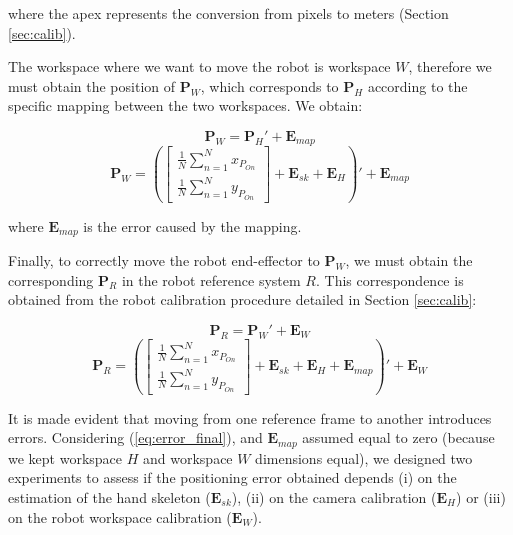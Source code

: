 \documentclass[a4paper, 10 pt, conference]{ieeeconf}      %
\begin{document}
where the apex represents the conversion from pixels to meters (Section \ref{sec:calib}).

The workspace where we want to move the robot is workspace $W$, therefore we must obtain the position of $\mathbf{P}_W$, which corresponds to $\mathbf{P}_H$ according to the specific mapping between the two workspaces. We obtain:

\begin{equation}
\mathbf{P}_W = \mathbf{P}_H' + \mathbf{E}_{map}
\end{equation}
\begin{equation}
\mathbf{P}_W = \left(\begin{bmatrix}
\frac{1}{N}\sum_{n=1}^{N}x_{P_{On}} \\
\frac{1}{N}\sum_{n=1}^{N}y_{P_{On}}
\end{bmatrix} + \mathbf{E}_{sk} + \mathbf{E}_{H}\right)' + \mathbf{E}_{map}
\end{equation}

where $\mathbf{E}_{map}$ is the error caused by the mapping.

Finally, to correctly move the robot end-effector to $\mathbf{P}_W$, we must obtain the corresponding $\mathbf{P}_R$ in the robot reference system $R$. This correspondence is obtained from the robot calibration procedure detailed in Section \ref{sec:calib}: 

\begin{equation}
\mathbf{P}_R = \mathbf{P}_W' + \mathbf{E}_W
\end{equation}
\begin{equation}\label{eq:error_final}
\mathbf{P}_R = \left(\begin{bmatrix}
\frac{1}{N}\sum_{n=1}^{N}x_{P_{On}} \\
\frac{1}{N}\sum_{n=1}^{N}y_{P_{On}}
\end{bmatrix} + \mathbf{E}_{sk} + \mathbf{E}_{H} + \mathbf{E}_{map} \right)' + \mathbf{E}_W
\end{equation}

It is made evident that moving from one reference frame to another introduces errors. Considering (\ref{eq:error_final}), and $\mathbf{E}_{map}$ assumed equal to zero (because we kept workspace $H$ and workspace $W$ dimensions equal), we designed two experiments to assess if the positioning error obtained depends (i) on the estimation of the hand skeleton ($\mathbf{E}_{sk}$), (ii) on the camera calibration ($\mathbf{E}_{H}$) or (iii) on the robot workspace calibration ($\mathbf{E}_{W}$).
\end{document}
